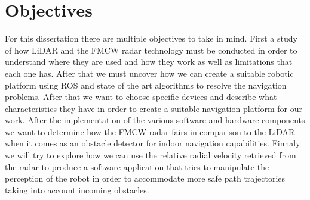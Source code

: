 \section{Objectives}
For this dissertation there are multiple objectives to take in mind. First a study of how \ac{LiDAR} and the \ac{FMCW} \ac{radar} technology must be conducted in order to understand where they are used and how they work as well as limitations that each one has. After that we must uncover how we can create a suitable robotic platform using \ac{ROS}  and state of the art algorithms to resolve the navigation problems. After that we want to choose  specific devices and describe what characteristics they have in order to create a suitable navigation platform for our work. After the implementation of the various software and hardware components we want to determine how the \ac{FMCW} \ac{radar} fairs in comparison to the \ac{LiDAR} when it comes as an obstacle detector for indoor navigation capabilities. Finnaly we will try to explore how we can use the relative radial velocity retrieved from the \ac{radar} to produce a software application that tries to manipulate the perception of the robot in order to accommodate more safe path trajectories taking into account incoming obstacles. 












